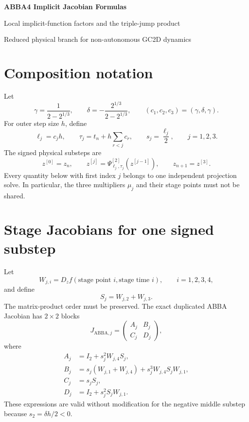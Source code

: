 \documentclass[11pt,a4paper]{article}
\newcommand{\Id}{I}
\begin{document}
\begin{center}
\end{center}


\begin{center}
  {\LARGE\bfseries\color{blue}ABBA4 Implicit Jacobian Formulas}\par
  \vspace{0.35em}
  {\large Local implicit-function factors and the triple-jump product}\par
  \vspace{0.45em}
  {\small Reduced physical branch for non-autonomous GC2D dynamics}
\end{center}

\section{Composition notation}

Let
\[
 \gamma=\frac{1}{2-2^{1/3}},
 \qquad
 \delta=-\frac{2^{1/3}}{2-2^{1/3}},
 \qquad
 (c_1,c_2,c_3)=(\gamma,\delta,\gamma).
\]
For outer step size $h$, define
\[
 \ell_j=c_jh,
 \qquad
 \tau_j=t_n+h\sum_{r<j}c_r,
 \qquad
 s_j=\frac{\ell_j}{2},
 \qquad
 j=1,2,3.
\]
The signed physical substeps are
\[
 z^{[0]}=z_n,
 \qquad
 z^{[j]}=\Psi^{[2]}_{\ell_j,\tau_j}(z^{[j-1]}),
 \qquad
 z_{n+1}=z^{[3]}.
\]
Every quantity below with first index $j$ belongs to one independent
projection solve.  In particular, the three multipliers $\mu_j$ and their
stage points must not be shared.

\section{Stage Jacobians for one signed substep}

Let
\[
 W_{j,i}=D_zf(\text{stage point }i,\text{stage time }i),
 \qquad i=1,2,3,4,
\]
and define
\[
 S_j=W_{j,2}+W_{j,3}.
\]
The matrix-product order must be preserved.  The exact duplicated ABBA
Jacobian has $2\times2$ blocks
\[
 J_{\mathrm{ABBA},j}
 =\begin{pmatrix}A_j&B_j\\C_j&D_j\end{pmatrix},
\]
where
\begin{align*}
 A_j&=\Id_2+s_j^2W_{j,4}S_j,\\
 B_j&=s_j(W_{j,1}+W_{j,4})
      +s_j^3W_{j,4}S_jW_{j,1},\\
 C_j&=s_jS_j,\\
 D_j&=\Id_2+s_j^2S_jW_{j,1}.
\end{align*}
These expressions are valid without modification for the negative middle
substep because $s_2=\delta h/2<0$.
\end{document}
